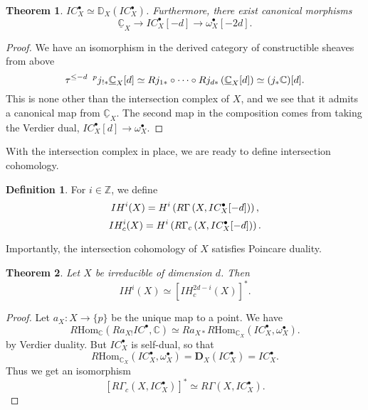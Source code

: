 \documentclass[letterpaper, 12pt]{article}
\newcommand{\C}{\mathbb{C}}
\newcommand{\Z}{\mathbb{Z}}
\newcommand{\Hom}{\text{Hom}}
\newtheorem{theorem}{Theorem}
\theoremstyle{definition}
\newtheorem{definition}{Definition}
\theoremstyle{remark}
\begin{document}
\begin{theorem}\label{canonical-morphisms}
    \(IC_X^{\bullet} \simeq \mathbb{D}_X (IC_X^{\bullet}) \). Furthermore, there exist canonical morphisms
    \begin{equation}
        \underline{\C}_X \to IC_X^{\bullet}[-d] \to \omega_X^\bullet[-2d].
    \end{equation}
\end{theorem}
\begin{proof}
We have an isomorphism in the derived category of constructible sheaves
from above
\begin{equation}
    \tau^{\leq -d}\ \prescript{p}{}{j}_{!*} \underline{\C}_X[d] \simeq
     Rj_{1*} \circ \cdots \circ Rj_{d*}
     \paren{\underline{\C}_X[d]} \simeq (j_* \C)[d].
\end{equation}
This is none other than the intersection complex of $X$, and we see that it admits a canonical map from $\underline{\C}_X$. The second map in the composition comes from taking the Verdier dual,
\(IC_X^\bullet[d] \to \omega_X^\bullet \).
\end{proof}

With the intersection complex in place, we are ready to define intersection cohomology.
\begin{definition}
    For $i \in \Z$, we define
    \begin{equation}
        IH^i(X) = H^i\left( {R\Gamma\left( {X, IC_X^\bullet[-d]} \right)} \right),
    \end{equation}
    \begin{equation}
        IH_c^i(X) = H^i\left( {R\Gamma_c\left( {X, IC_X^\bullet[-d]} \right)} \right).
    \end{equation}
\end{definition}

Importantly, the intersection cohomology of $X$ satisfies Poincare duality.
\begin{theorem}
    Let $X$ be irreducible of dimension $d$. Then
    \begin{equation}
        IH^i(X) \simeq \left[IH_c^{2d-i}(X)\right]^*.
    \end{equation}
\end{theorem}
\begin{proof}
Let $a_X: X \to \{p\}$ be the unique map to a point. We have 
\begin{equation}
    R\Hom_\C(Ra_{X!} IC^\bullet, \C) \simeq 
    Ra_{X*} R\Hom_{\C_X}(IC_X^\bullet, \omega_X^\bullet).
\end{equation}
by Verdier duality. But \(IC_X^\bullet\) is self-dual, so that
\begin{equation*}
    R\Hom_{\C_X}(IC_X^\bullet, \omega_X^\bullet) = 
    \mathbf{D}_X(IC_X^\bullet) = IC_X^\bullet.
\end{equation*}
Thus we get an isomorphism
\begin{equation}
    \left[R \Gamma_c(X, IC_X^\bullet)\right]^* \simeq 
    R\Gamma(X, IC_X^\bullet).
\end{equation}


\end{proof}
\end{document}
